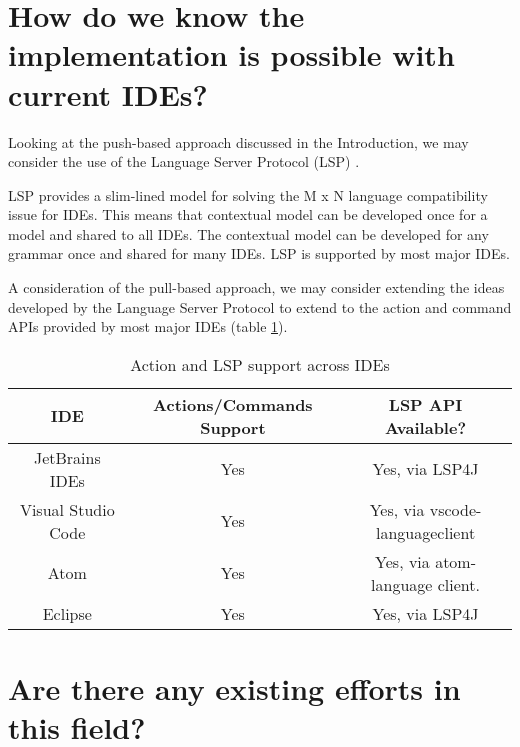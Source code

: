 \section{How do we know the implementation is possible with current IDEs?}

Looking at the push-based approach discussed in the Introduction, we may consider the use of the Language Server Protocol (LSP) \parencite{lspGitHubSiteMSFT}.

LSP provides a slim-lined model for solving the M x N language compatibility issue for IDEs. This means that contextual model can be developed once for a model and shared to all IDEs. The contextual model can be developed for any grammar once and shared for many IDEs. LSP is supported by most major IDEs.

A consideration of the pull-based approach, we may consider extending the ideas developed by the Language Server Protocol to extend to the action and command APIs provided by most major IDEs (table \ref{table:1}).

\begin{table}
\centering
\begin{tabular}{ | c | c | c |}
	\hline
		IDE & Actions/Commands Support & LSP API Available?\\
	\hline
	\hline
		JetBrains IDEs & Yes & Yes, via LSP4J\\ 
		Visual Studio Code & Yes & Yes, via vscode-languageclient \\
		Atom & Yes & Yes, via atom-language client.\\
		Eclipse & Yes & Yes, via LSP4J\\
	\hline
\end{tabular}
\caption{Action and LSP support across IDEs}
\label{table:1}
\end{table}


\section{Are there any existing efforts in this field?}
